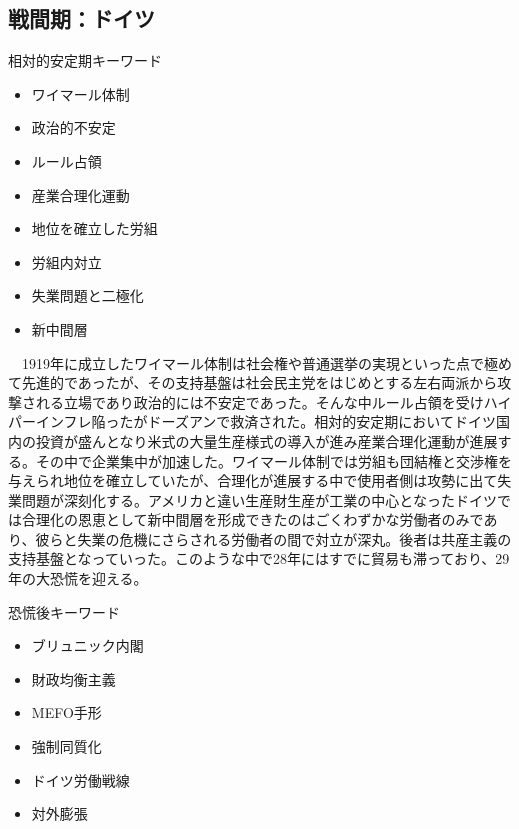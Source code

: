 \documentclass{jsarticle}
\begin{document}
\subsection{戦間期：ドイツ}
相対的安定期キーワード
\begin{itemize}
\item ワイマール体制
\item 政治的不安定
\item ルール占領
\item 産業合理化運動
\item 地位を確立した労組
\item 労組内対立
\item 失業問題と二極化
\item 新中間層
\end{itemize}
　1919年に成立したワイマール体制は社会権や普通選挙の実現といった点で極めて先進的であったが、その支持基盤は社会民主党をはじめとする左右両派から攻撃される立場であり政治的には不安定であった。そんな中ルール占領を受けハイパーインフレ陥ったがドーズアンで救済された。相対的安定期においてドイツ国内の投資が盛んとなり米式の大量生産様式の導入が進み産業合理化運動が進展する。その中で企業集中が加速した。ワイマール体制では労組も団結権と交渉権を与えられ地位を確立していたが、合理化が進展する中で使用者側は攻勢に出て失業問題が深刻化する。アメリカと違い生産財生産が工業の中心となったドイツでは合理化の恩恵として新中間層を形成できたのはごくわずかな労働者のみであり、彼らと失業の危機にさらされる労働者の間で対立が深丸。後者は共産主義の支持基盤となっていった。このような中で28年にはすでに貿易も滞っており、29年の大恐慌を迎える。

恐慌後キーワード
\begin{itemize}
\item ブリュニック内閣
\item 財政均衡主義
\item MEFO手形
\item 強制同質化
\item ドイツ労働戦線
\item 対外膨張
\end{itemize}
\end{document}
